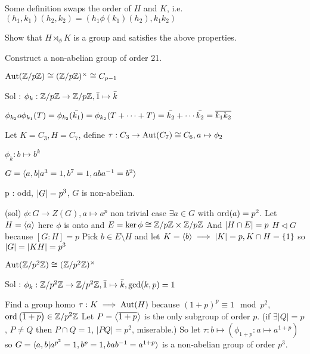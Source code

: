 \begin{remark}
Some definition swaps the order of $H$ and $K$, i.e. $(h_1, k_1) (h_2, k_2) = (h_1 \phi(k_1)(h_2), k_1 k_2)$
\end{remark}

\begin{exercise}
Show that $H \rtimes_\phi K$ is a group and satisfies the above properties.
\end{exercise}

\begin{example}
Construct a non-abelian group of order 21.
\end{example}

\begin{fact}
  $\Aut(\quot{\Zb}{p\Zb}) \cong (\quot{\Zb}{p\Zb})^\times \cong C_{p-1}$
\end{fact}
Sol : $\phi_k: \quot{\Zb}{p\Zb} \to \quot{\Zb}{p\Zb}, \bar{1} \mapsto \bar{k}$

$\phi_{k_2} o \phi_{k_1} (T) = \phi_{k_2}(\bar{k_1}) = \phi_{k_2}(T+\cdots+T)
= \bar{k_2} + \cdots \bar{k_2} = \ob{k_1 k_2}$

Let $K = C_3, H = C_7$, define $\tau : C_3 \to \Aut(C_7) \cong C_6, a \mapsto \phi_2$

$\phi_k : b \mapsto b^k$

$G = \gen{a, b | a^3=1, b^7=1, aba^{-1}=b^2}$

\begin{example}
  p : odd, $\abs{G} = p^3$, $G$ is non-abelian.
\end{example}
(sol)
$\phi: G \to Z(G), a \mapsto a^p$ non trivial
case $\exists a \in G $ with $\ord(a) = p^2$.
Let $H = \gen{a}$ here $\phi$ is onto and $E = \ker \phi \cong \quot{\Zb}{p\Zb} \times \quot{\Zb}{p\Zb}$
And $\abs{H \cap E} = p$
$H \lhd G$ because $[G: H]=p$
Pick $b \in E \setminus H$ and let $K = \gen{b} \implies \abs{K} = p, K \cap H = \{1\}$
so $\abs{G} = \abs{KH} = p^3$

\begin{fact}
  $\Aut(\quot{\Zb}{p^2 \Zb}) \cong (\quot{\Zb}{p^2 \Zb})^\times$
\end{fact}
Sol : $\phi_k: \quot{\Zb}{p^2\Zb} \to \quot{\Zb}{p^2\Zb}, \bar{1} \mapsto \bar{k}, \gcd(k, p) = 1$

Find a group homo $\tau : K \implies \Aut(H)$
because $(1+p)^p \equiv 1 \mod p^2$, $\ord\left(\ob{1+p}\right) \in
\quot{\Zb}{p^2\Zb}$
Let $P = \gen*{\ob{1+p}}$ is the only subgroup of order $p$.
(if $\exists |Q| = p$, $P \neq Q$ then $P \cap Q = 1$, $|PQ| = p^2$, miserable.)
So let $\tau : b \mapsto (\phi_{1+p} : a \mapsto a^{1+p})$
so $G = \gen{a, b | a^{p^2}=1, b^p = 1, bab^{-1} = a^{1+p}}$ is a non-abelian group of order $p^3$.

